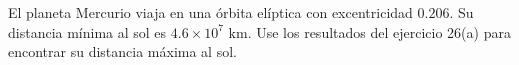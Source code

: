 \item El planeta Mercurio viaja en una órbita elíptica con excentricidad $0.206$. Su distancia mínima al sol es $4.6 \times 10^7 \text{ km}$. Use los resultados del ejercicio 26(a) para encontrar su distancia máxima al sol.
